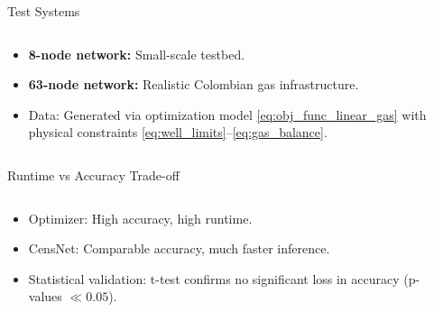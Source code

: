 \documentclass[hyperref={colorlinks,citecolor=blue,linkcolor=blue,urlcolor=blue}]{beamer}
\begin{document}
\begin{frame}{Test Systems}
    \begin{columns}[T]
        \begin{column}{0.6\textwidth}
            \begin{itemize}
                \item \textbf{8-node network:} Small-scale testbed.
                \item \textbf{63-node network:} Realistic Colombian gas infrastructure.
                \item Data: Generated via optimization model \eqref{eq:obj_func_linear_gas} with physical constraints \eqref{eq:well_limits}–\eqref{eq:gas_balance}.
            \end{itemize}
        \end{column}
        \begin{column}{0.4\textwidth}
            \centering
        \end{column}
    \end{columns}
\end{frame}

\begin{frame}{Runtime vs Accuracy Trade-off}
    \begin{columns}[T]
        \begin{column}{0.55\textwidth}
            \begin{itemize}
                \item Optimizer: High accuracy, high runtime.
                \item CensNet: Comparable accuracy, much faster inference.
                \item Statistical validation: t-test confirms no significant loss in accuracy (p-values $\ll 0.05$).
            \end{itemize}
        \end{column}
        \begin{column}{0.45\textwidth}
            \centering
        \end{column}
    \end{columns}
\end{frame}
\end{document}

